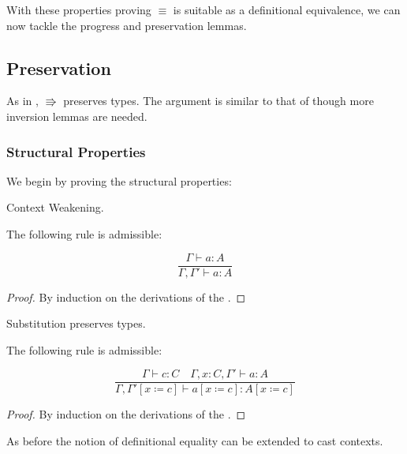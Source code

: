 With these properties proving $\equiv$ is suitable as a definitional equivalence, we can now tackle the progress and preservation lemmas.
 
\subsection{Preservation}
 
As in , $\Rrightarrow$ preserves types.
The argument is similar to that of  though more inversion lemmas are needed.
 
\subsubsection{Structural Properties}
We begin by proving the structural properties:
\begin{lem} Context Weakening.
 
The following rule is admissible:
 
\[
\frac{\Gamma \vdash a:A}{\Gamma ,\Gamma' \vdash a:A}
\]
\end{lem}
 
\begin{proof}
By induction on the derivations of the \csys{}.
\end{proof}

\begin{lem} Substitution preserves types.
 
The following rule is admissible:
 
\[
\frac{\Gamma \vdash c:C \quad \Gamma, x:C, \Gamma' \vdash a:A}{\Gamma, \Gamma' \left[x\coloneqq c\right]\vdash a\left[x\coloneqq c\right]:A\left[x\coloneqq c\right]}
\]
\end{lem}
\begin{proof}
By induction on the derivations of the \csys{}.
\end{proof}

As before the notion of definitional equality can be extended to cast contexts. %
 
 
 
